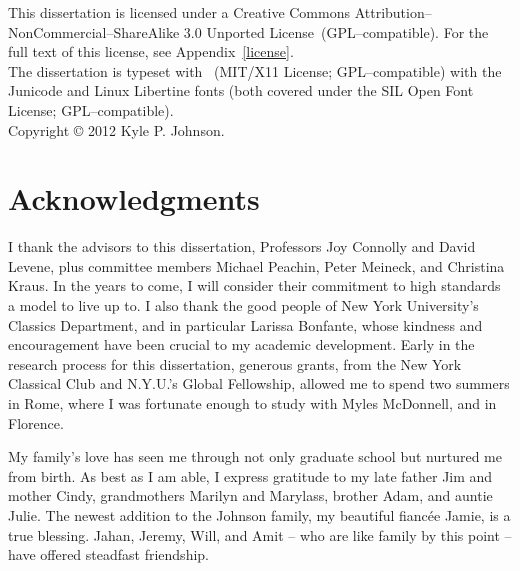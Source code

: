 \documentclass[12pt,letterpaper,oneside,final]{memoir}
\begin{document}
\newpage

\thispagestyle{empty}

\begin{center} This dissertation is licensed under a Creative Commons Attribution--NonCommercial--ShareAlike 3.0 Unported License \ccbyncsa{}\,(GPL--compatible). For the full text of this license, see Appendix~\ref{license}. \\ The dissertation is typeset with \XeLaTeX\ (MIT/X11 License; GPL--compatible) with the Junicode and Linux Libertine fonts (both covered under the SIL Open Font License; GPL--compatible). \\ Copyright © 2012 Kyle P. Johnson. \end{center}

\newpage

\thispagestyle{empty}

\begin{comment}
\chapter{Dedication}
\SingleSpacing
\end{comment}
\DoubleSpacing

\newpage

\chapter{Acknowledgments}%

I thank the advisors to this dissertation, Professors Joy Connolly and David Levene, plus committee members Michael Peachin, Peter Meineck, and Christina Kraus. In the years to come, I will consider their commitment to high standards a model to live up to. I also thank the good people of New York University's Classics Department, and in particular Larissa Bonfante, whose kindness and encouragement have been crucial to my academic development. Early in the research process for this dissertation, generous grants, from the New York Classical Club and N.Y.U.'s Global Fellowship, allowed me to spend two summers in Rome, where I was fortunate enough to study with Myles McDonnell, and in Florence.

My family's love has seen me through not only graduate school but nurtured me from birth. As best as I am able, I express gratitude to my late father Jim and mother Cindy, grandmothers Marilyn and Marylass, brother Adam, and auntie Julie. The newest addition to the Johnson family, my beautiful fiancée Jamie, is a true blessing. Jahan, Jeremy, Will, and Amit -- who are like family by this point -- have offered steadfast friendship.
\end{document}

